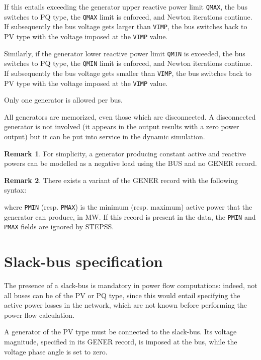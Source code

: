 If this entails exceeding the generator upper reactive power limit {\tt QMAX}, the bus switches to PQ type, the {\tt QMAX} limit is enforced, and Newton iterations continue. If subsequently the bus voltage gets larger than {\tt VIMP}, the bus switches back to PV type with the voltage imposed at the {\tt VIMP} value.

Similarly, if the generator lower reactive power limit {\tt QMIN} is exceeded, the bus switches to PQ type, the {\tt QMIN} limit is enforced, and Newton iterations continue. If subsequently the bus voltage gets smaller than {\tt VIMP}, the bus switches back to PV type with the voltage imposed at the {\tt VIMP} value.

Only one generator is allowed per bus.

All generators are memorized, even those which are disconnected. A disconnected generator is not involved  (it appears in the output results with a zero power output) but it can be put into service in the
dynamic simulation.

{\bf \large Remark 1}. For simplicity, a generator producing constant active and reactive powers can be modelled as a negative load using the BUS and no GENER record.

{\bf \large Remark 2}. There exists a variant of the GENER record with the following syntax:

\hspace*{5ex}{\tt GENER NAME BUS P Q V SNOM QMIN QMAX PMIN PMAX BR ;}

where {\tt PMIN} (resp. {\tt PMAX}) is the minimum (resp. maximum) active power that the generator can produce, in MW. If this record is present in the data, the {\tt PMIN} and {\tt PMAX} fields are ignored by STEPSS.


\section{Slack-bus specification}

The presence of a slack-bus is mandatory in power flow computations: indeed, not all buses can be of the PV or PQ type, since this would entail specifying the active power losses in the network, which are not known before performing the power flow calculation.

A generator of the PV type must be connected to the slack-bus. Its voltage magnitude, specified in its GENER record, is imposed at the bus, while the voltage phase angle is set to zero.

